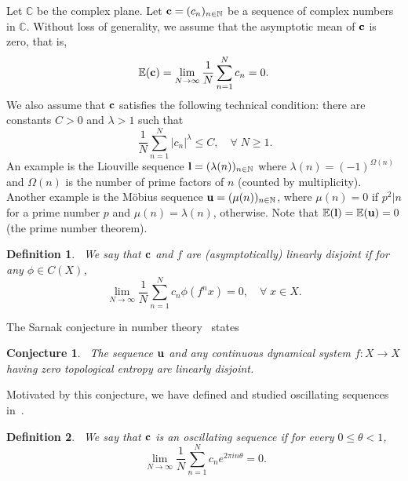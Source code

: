 \documentclass[12pt,letterpaper]{amsart}
\newtheorem {definition}{Definition}
\newtheorem {conjecture}{Conjecture}
\newcommand {\C} {{\mathbb C}}
\newcommand {\N} {{\mathbb N}}
\begin{document}
Let $\C$ be the complex plane. Let ${\bf c}=(c_{n})_{n\in \N}$ be a sequence of complex numbers in $\C$. Without loss of generality, we assume that the asymptotic mean of ${\bf c}$ is zero, that is,  
$$
{\mathbb E}({\bf c})=\lim_{N\to \infty} \frac{1}{N} \sum_{n=1}^{N} c_{n} =0.
$$
We also assume that ${\bf c}$ satisfies the following technical condition: there are constants $C>0$ and $\lambda >1$ such that 
 \begin{equation}~\label{cn}
\frac{1}{N} \sum_{n=1}^{N} |c_{n}|^{\lambda} \leq C, \quad \forall\; N\geq 1.
\end{equation}  
An example is the Liouville sequence ${\bf l} =(\lambda (n))_{n\in \N}$ where $\lambda (n) =(-1)^{\Omega (n)}$ and $\Omega (n)$ is the number of prime factors of $n$ (counted by multiplicity).  Another example is the M\"obius sequence ${\bf u} = (\mu (n))_{n\in \N}$, where $\mu (n)=0$ if $p^{2}|n$ for a prime number $p$ and $\mu (n)=\lambda (n)$, otherwise. Note that ${\mathbb E} ({\bf l})={\mathbb E} ({\bf u})=0$ (the prime number theorem). 

\medskip 
\begin{definition}~\label{lld}
We say that ${\bf c}$ and $f$ are (asymptotically) linearly disjoint 
if for any $\phi\in C(X)$,
\begin{equation}\label{ld}
  \lim_{N\to \infty} \frac{1}{N}\sum_{n=1}^N c_n \phi (f^{n}x) =0, \quad \forall\; x\in X.
\end{equation}
\end{definition}

The Sarnak conjecture in number theory~\cite{Sa1,Sa2} states

\medskip
\begin{conjecture}~\label{sc}
The sequence ${\bf u}$ and any continuous dynamical system $f: X\to X$ having zero topological entropy are linearly disjoint.
\end{conjecture}

Motivated by this conjecture, we have defined and studied oscillating sequences in~\cite{FJ}.

\medskip
\begin{definition}~\label{os}
We say that ${\bf c}$ is an oscillating sequence 
if for every $0\leq \theta <1$,
\begin{equation}~\label{hoosseq}
\lim_{N\to \infty} \frac{1}{N} \sum_{n=1}^{N} c_{n}e^{2\pi i n\theta}=0.
\end{equation} 
\end{definition} 
\end{document}
